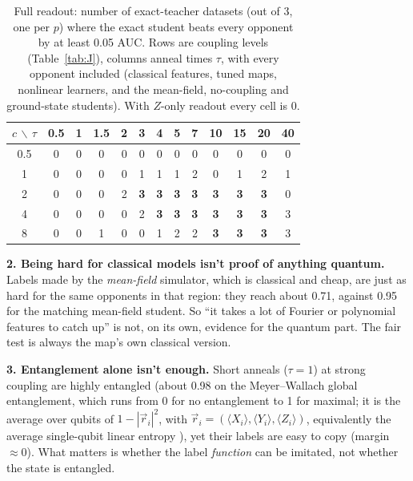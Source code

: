 \documentclass[11pt]{article}
\begin{document}
\begin{table}[H]\centering\small
\caption{Full readout: number of exact-teacher datasets (out of 3, one per $p$) where the exact student beats
every opponent by at least 0.05 AUC. Rows are coupling levels (Table~\ref{tab:J}), columns anneal times
$\tau$, with every opponent included (classical features, tuned maps, nonlinear learners, and the
mean-field, no-coupling and ground-state students). With $Z$-only readout every cell is 0.}\label{tab:window}
\begin{tabular}{@{}ccccccccccccc@{}}\toprule
$c$ $\backslash$ $\tau$ & 0.5 & 1 & 1.5 & 2 & 3 & 4 & 5 & 7 & 10 & 15 & 20 & 40\\\midrule
0.5 & 0 & 0 & 0 & 0 & 0 & 0 & 0 & 0 & 0 & 0 & 0 & 0\\
1   & 0 & 0 & 0 & 0 & 1 & 1 & 1 & 2 & 0 & 1 & 2 & 1\\
2   & 0 & 0 & 0 & 2 & \textbf{3} & \textbf{3} & \textbf{3} & \textbf{3} & \textbf{3} & \textbf{3} & \textbf{3} & 0\\
4   & 0 & 0 & 0 & 0 & 2 & \textbf{3} & \textbf{3} & \textbf{3} & \textbf{3} & \textbf{3} & \textbf{3} & 3\\
8   & 0 & 0 & 1 & 0 & 0 & 1 & 2 & 2 & \textbf{3} & \textbf{3} & \textbf{3} & 3\\\bottomrule
\end{tabular}
\end{table}

\textbf{2. Being hard for classical models isn't proof of anything quantum.} Labels made by the
\emph{mean-field} simulator, which is classical and cheap, are just as hard for the same opponents in that
region: they reach about 0.71, against 0.95 for the matching mean-field student. So ``it takes a lot of
Fourier or polynomial features to catch up'' is not, on its own, evidence for the quantum part. The fair test
is always the map's own classical version.

\textbf{3. Entanglement alone isn't enough.} Short anneals ($\tau=1$) at strong coupling are highly entangled
(about 0.98 on the Meyer--Wallach global entanglement, which runs from 0 for no entanglement to 1 for maximal; it is the average over qubits of $1-|\vec r_i|^2$, with $\vec r_i=(\langle X_i\rangle,\langle Y_i\rangle,\langle Z_i\rangle)$, equivalently the average single-qubit linear entropy \citep{Meyer2002,Brennen2003}), yet their labels are easy to copy (margin $\approx0$).
What matters is whether the label \emph{function} can be imitated, not whether the state is entangled.
\end{document}
